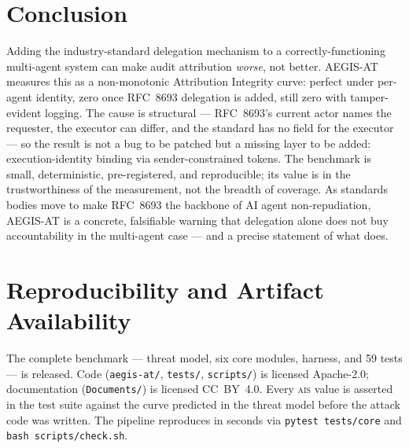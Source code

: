 \documentclass[11pt]{article}
\newcommand{\ais}{\textsc{ais}}
\newcommand{\code}[1]{\texttt{#1}}
\begin{document}
\section{Conclusion}
\label{sec:conclusion}

Adding the industry-standard delegation mechanism to a correctly-functioning
multi-agent system can make audit attribution \emph{worse}, not better. AEGIS-AT
measures this as a non-monotonic Attribution Integrity curve: perfect under
per-agent identity, zero once RFC~8693 delegation is added, still zero with
tamper-evident logging. The cause is structural --- RFC~8693's current actor names
the requester, the executor can differ, and the standard has no field for the
executor --- so the result is not a bug to be patched but a missing layer to be
added: execution-identity binding via sender-constrained tokens. The benchmark is
small, deterministic, pre-registered, and reproducible; its value is in the
trustworthiness of the measurement, not the breadth of coverage. As standards
bodies move to make RFC~8693 the backbone of AI agent non-repudiation, AEGIS-AT
is a concrete, falsifiable warning that delegation alone does not buy
accountability in the multi-agent case --- and a precise statement of what does.

\section*{Reproducibility and Artifact Availability}
The complete benchmark --- threat model, six core modules, harness, and 59 tests
--- is released. Code (\code{aegis-at/}, \code{tests/}, \code{scripts/}) is
licensed Apache-2.0; documentation (\code{Documents/}) is licensed CC~BY~4.0.
Every \ais{} value is asserted in the test suite against the curve predicted in
the threat model before the attack code was written. The pipeline reproduces in
seconds via \code{pytest tests/core} and \code{bash scripts/check.sh}.
\end{document}
